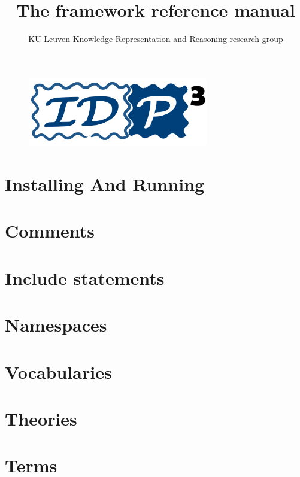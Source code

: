 \documentclass[a4]{article}
\title{The \idp framework reference manual}
\author{KU Leuven Knowledge Representation and Reasoning research group}
\begin{document}
\maketitle

\begin{figure}[!h]
\centering
\includegraphics[width=0.7\textwidth]{idp3logo}
\end{figure}

\newpage
\tableofcontents

\newpage


\section{Installing And Running}


\section{Comments}


\section{Include statements}


\section{Namespaces}


\section{Vocabularies}


\section{Theories}


\section{Terms}

\end{document}
